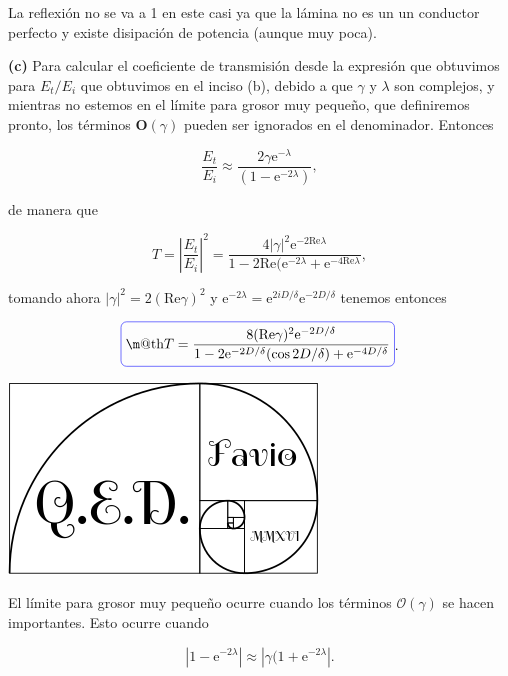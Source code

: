 \documentclass[a4paper,11pt]{article}
\makeatletter
\numberwithin{equation}{section}
\newcommand*{\boxcolor}{blue}
\renewcommand{\boxed}[1]{\textcolor{\boxcolor}{%
\tikz[baseline={([yshift=-1ex]current bounding box.center)}] \node [rectangle, minimum width=1ex,rounded corners,draw] {\normalcolor\m@th$\displaystyle#1$};}}
\newcommand{\euler}{\mathrm{e}}
\makeatother
\begin{document}
La reflexión no se va a 1 en este casi ya que la lámina no es un un conductor perfecto 
y existe disipación de potencia (aunque muy poca). 

\vspace{.3cm}

\textbf{(c)} Para calcular el coeficiente de transmisión desde la expresión que 
obtuvimos para $E_t/E_i$ que obtuvimos en el inciso (b), debido a que $\gamma$ y 
$\lambda$ son complejos, y mientras no estemos en el límite para grosor muy 
pequeño, que definiremos pronto, los términos $\mathbf{O}(\gamma)$ pueden ser 
ignorados en el denominador. Entonces 

\begin{equation}
 \frac{E_t}{E_i} \approx \frac{2 \gamma \euler^{-\lambda}}{(1 - \euler^{-2\lambda})},
\end{equation}

de manera que 

\begin{equation}
 T = \left|\frac{E_t}{E_i} \right|^2 = \frac{4|\gamma|^2 \euler^{-2\text{Re}\lambda}}{
 1 - 2 \text{Re}(\euler^{-2\lambda} + \euler^{-4\text{Re} \lambda}},
\end{equation}

tomando ahora $|\gamma|^2 = 2(\text{Re} \gamma)^2$ y $\euler^{-2\lambda} 
= \euler^{2i D / \delta}\euler^{-2D/\delta}$ tenemos entonces 

\begin{equation}
 \boxed{T = \frac{8(\text{Re} \gamma)^2 \euler^{-2D/\delta}}{1 - 2\euler^{-2D/\delta} 
 (\cos{2D/\delta) + \euler^{-4D/\delta}}}}.
\end{equation}

\hspace{10cm}\includegraphics[scale=0.25]{logoQED}

El límite para grosor muy pequeño ocurre cuando los términos $\mathcal{O}(\gamma)$ 
se hacen importantes. Esto ocurre cuando 

\begin{equation}
 |1 - \euler^{-2\lambda}| \approx |\gamma(1 + \euler^{-2\lambda}|.
\end{equation}
\end{document}
